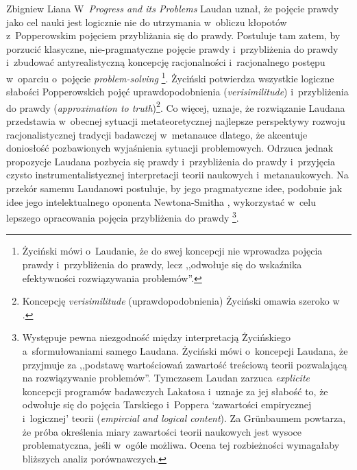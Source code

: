 \begin{artplenv}{Zbigniew Liana}
W~\textit{Progress and its Problems} Laudan
\parencite*[][]{laudan_progress_1977} %
 uznał, że pojęcie prawdy jako cel nauki jest logicznie nie do utrzymania w~obliczu kłopotów z~Popperowskim pojęciem przybliżania się do prawdy. Postuluje tam zatem, by porzucić klasyczne, nie-pragmatyczne pojęcie prawdy i~przybliżenia do prawdy i~zbudować antyrealistyczną koncepcję racjonalności i~racjonalnego postępu w~oparciu o~pojęcie \textit{problem-solving} 
\parencite[][s.~109.121-125]{laudan_progress_1977}%
\footnote{Życiński 
\parencite*[][s.~203]{zycinski_teizm_1985} %
 mówi o~Laudanie, że do swej koncepcji nie wprowadza pojęcia prawdy i~przybliżenia do prawdy, lecz ,,odwołuje się do wskaźnika efektywności rozwiązywania problemów''.}. Życiński potwierdza wszystkie logiczne słabości Popperowskich pojęć uprawdopodobnienia (\textit{verisimilitude}) i~przybliżenia do prawdy (\textit{approximation to truth})\footnote{Koncepcję \textit{verisimilitude} (uprawdopodobnienia) Życiński omawia szeroko w~
\parencites*[][s.~110–119]{zycinski_elementy_1996}[][s.~147–160]{zycinski_elementy_2015}.%
}. Co więcej, uznaje, że rozwiązanie Laudana przedstawia w~obecnej sytuacji metateoretycznej najlepsze perspektywy rozwoju racjonalistycznej tradycji badawczej w~metanauce dlatego, że akcentuje doniosłość pozbawionych wyjaśnienia sytuacji problemowych. Odrzuca jednak propozycje Laudana pozbycia się prawdy i~przybliżenia do prawdy i~przyjęcia czysto instrumentalistycznej interpretacji teorii naukowych i~metanaukowych. Na przekór samemu Laudanowi postuluje, by jego pragmatyczne idee, podobnie jak idee jego intelektualnego oponenta Newtona-Smitha 
\parencite*[][]{newton-smith_rationality_1981}, %
 wykorzystać w~celu lepszego opracowania pojęcia przybliżenia do prawdy 
\parencites[][s.~117n]{zycinski_elementy_1996}[][s.~156nn]{zycinski_elementy_2015}%
\footnote{Występuje pewna niezgodność między interpretacją Życińskiego a~sformułowaniami samego Laudana. Życiński mówi 
\parencites*[][s.~117]{zycinski_elementy_1996}[][s.~156]{zycinski_elementy_2015} %
 o~koncepcji Laudana, że przyjmuje za ,,podstawę wartościowań zawartość treściową teorii pozwalającą na rozwiązywanie problemów''. Tymczasem Laudan 
\parencite*[][s.~77]{laudan_progress_1977} %
 zarzuca \textit{explicite} koncepcji programów badawczych Lakatosa i~uznaje za jej słabość to, że odwołuje się do pojęcia Tarskiego i~Poppera ‘zawartości empirycznej i~logicznej' teorii (\textit{empircial and logical content}). Za Grünbaumem powtarza, że próba określenia miary zawartości teorii naukowych jest wysoce problematyczna, jeśli w~ogóle możliwa. Ocena tej rozbieżności wymagałaby bliższych analiz porównawczych.}.


\end{artplenv}
